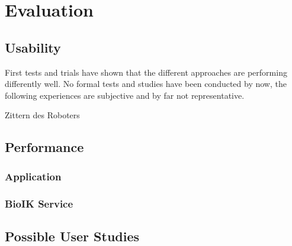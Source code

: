 \chapter{Evaluation}
\label{chap:eval}

\section{Usability}

First tests and trials have shown that the different approaches are performing differently well. No formal tests and studies have been conducted by now, the following experiences are subjective and by far not representative.

Zittern des Roboters

\section{Performance}

\subsection{Application}

\subsection{BioIK Service}

\section{Possible User Studies}